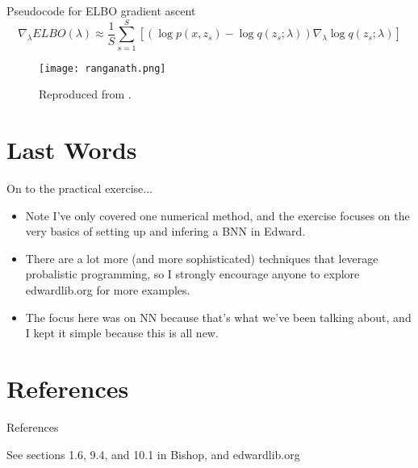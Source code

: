 \documentclass{beamer}
\begin{document}
\begin{frame}{Pseudocode for ELBO gradient ascent}
  \[\nabla_\lambda ELBO(\lambda) \approx \frac{1}{S} \sum_{s=1}^{S} \left[ \left( \log p(x, z_s) - \log q(z_s; \lambda)\right) \nabla_\lambda \log q(z_s; \lambda) \right]\]
  \begin{figure}
    \texttt{[image: ranganath.png]}
    \caption{Reproduced from \cite{ranganath2014}.}
  \end{figure}
\end{frame}

\section{Last Words}
\begin{frame}{On to the practical exercise...}
  \begin{itemize}
  \item Note I've only covered one numerical method, and the exercise focuses on the very basics of setting up and infering a BNN in Edward.
  \item There are a lot more (and more sophisticated) techniques that leverage probalistic programming, so I strongly encourage anyone to explore edwardlib.org for more examples.
  \item The focus here was on NN because that's what we've been talking about, and I kept it simple because this is all new.
  \end{itemize}
\end{frame}

    
\section{References}
\begin{frame}{References}
  \begin{block}{See sections 1.6, 9.4, and 10.1 in Bishop, and edwardlib.org}
    \AtNextBibliography{\small}
    \printbibliography
  \end{block}
\end{frame}

\end{document}
